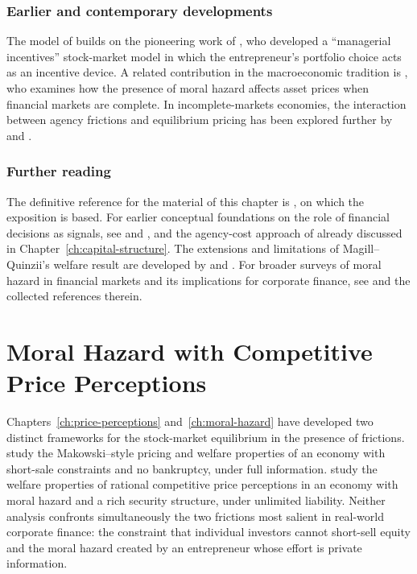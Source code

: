\documentclass[11pt,a4paper,oneside]{book}
\theoremstyle{plain}
\theoremstyle{definition}
\theoremstyle{remark}
\numberwithin{equation}{chapter}
\begin{document}
\subsection{Earlier and contemporary developments}

The model of \citet{MagillQuinzii2002} builds on the pioneering work of \citet{KihlstromMatthews1990}, who developed a ``managerial incentives'' stock-market model in which the entrepreneur's portfolio choice acts as an incentive device.
A related contribution in the macroeconomic tradition is \citet{Kocherlakota1998}, who examines how the presence of moral hazard affects asset prices when financial markets are complete.
In incomplete-markets economies, the interaction between agency frictions and equilibrium pricing has been explored further by \citet{BisinGottardiRampini2008} and \citet{AcharyaBisin2009}.

\subsection{Further reading}

The definitive reference for the material of this chapter is \citet{MagillQuinzii2002}, on which the exposition is based.
For earlier conceptual foundations on the role of financial decisions as signals, see \citet{Ross1977} and \citet{LelandPyle1977}, and the agency-cost approach of \citet{JensenMeckling1976} already discussed in Chapter~\ref{ch:capital-structure}.
The extensions and limitations of Magill--Quinzii's welfare result are developed by \citet{CalcagnoWagner2006} and \citet{QuigginChambers2006}.
For broader surveys of moral hazard in financial markets and its implications for corporate finance, see \citet{Tirole2006} and the collected references therein.

\chapter{Moral Hazard with Competitive Price Perceptions}
\label{ch:moral-hazard-cpp}

Chapters~\ref{ch:price-perceptions} and~\ref{ch:moral-hazard} have developed two distinct frameworks for the stock-market equilibrium in the presence of frictions.
\citet{BisinGottardiRuta2014} study the Makowski--style pricing and welfare properties of an economy with short-sale constraints and no bankruptcy, under full information.
\citet{MagillQuinzii2002} study the welfare properties of rational competitive price perceptions in an economy with moral hazard and a rich security structure, under unlimited liability.
Neither analysis confronts simultaneously the two frictions most salient in real-world corporate finance: the constraint that individual investors cannot short-sell equity and the moral hazard created by an entrepreneur whose effort is private information.
\end{document}
